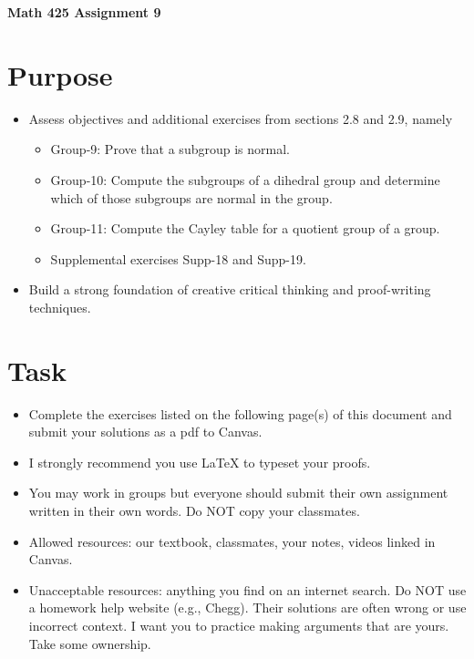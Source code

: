 \documentclass[12pt]{article}
\begin{document}
	\begin{center}
		{\Large \bf Math 425 Assignment 9}
	\end{center}
	\section*{Purpose}
	\begin{itemize}
		\item Assess objectives and additional exercises from sections 2.8 and 2.9, namely
		\begin{itemize} 
			\item Group-9:	Prove that a subgroup is normal.
			\item Group-10:	Compute the subgroups of a dihedral group and determine which of those subgroups are normal in the group.
			\item Group-11:	Compute the Cayley table for a quotient group of a group.
			\item Supplemental exercises Supp-18 and Supp-19.
		\end{itemize}
		\item Build a strong foundation of creative critical thinking and proof-writing techniques.
	\end{itemize}
	\section*{Task}
	\begin{itemize}
		\item Complete the exercises listed on the following page(s) of this document and submit your solutions as a pdf to Canvas.
		\item I strongly recommend you use LaTeX to typeset your proofs.
		\item You may work in groups but everyone should submit their own assignment written in their own words.  Do NOT copy your classmates.
		\item Allowed resources: our textbook, classmates, your notes, videos linked in Canvas.
		\item Unacceptable resources: anything you find on an internet search. Do NOT use a homework help website (e.g., Chegg). Their solutions are often wrong or use incorrect context.  I want you to practice making arguments that are yours. Take some ownership.
	\end{itemize}
\end{document}
